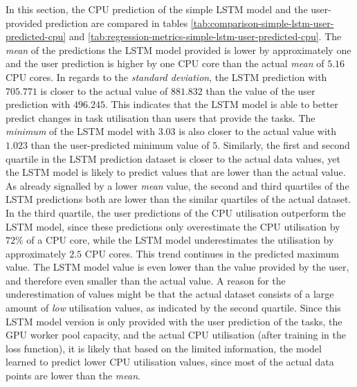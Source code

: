       In this section, the CPU prediction of the simple LSTM model and the user-provided prediction are compared in tables \ref{tab:comparison-simple-lstm-user-predicted-cpu} and \ref{tab:regression-metrics-simple-lstm-user-predicted-cpu}.
      The \emph{mean} of the predictions the LSTM model provided is lower by approximately one and the user prediction is higher by one CPU core than the actual \emph{mean} of $5.16$ CPU cores.
      In regards to the \emph{standard deviation}, the LSTM prediction with $705.771$ is closer to the actual value of $881.832$ than the value of the user prediction with $496.245$. This indicates that the LSTM model is able to better predict changes in task utilisation than users that provide the tasks. 
      The \emph{minimum} of the LSTM model with $3.03$ is also closer to the actual value with $1.023$ than the user-predicted minimum value of $5$.
      Similarly, the first and second quartile in the LSTM prediction dataset is closer to the actual data values, yet the LSTM model is likely to predict values that are lower than the actual value. As already signalled by a lower \emph{mean} value, the second and third quartiles of the LSTM predictions both are lower than the similar quartiles of the actual dataset. In the third quartile, the user predictions of the CPU utilisation outperform the LSTM model, since these predictions only overestimate the CPU utilisation by $72\%$ of a CPU core, while the LSTM model underestimates the utilisation by approximately $2.5$ CPU cores.
      This trend continues in the predicted maximum value. The LSTM model value is even lower than the value provided by the user, and therefore even smaller than the actual value.
      A reason for the underestimation of values might be that the actual dataset consists of a large amount of \emph{low} utilisation values, as indicated by the second quartile. Since this LSTM model version is only provided with the user prediction of the tasks, the GPU worker pool capacity, and the actual CPU utilisation (after training in the loss function), it is likely that based on the limited information, the model learned to predict lower CPU utilisation values, since most of the actual data points are lower than the \emph{mean}. 
